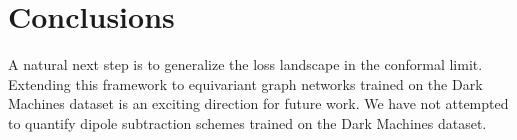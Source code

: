 \section{Conclusions}\label{sec:conclusions}

A natural next step is to generalize the loss landscape in the conformal
limit. Extending this framework to equivariant graph networks trained on
the Dark Machines dataset is an exciting direction for future work. We
have not attempted to quantify dipole subtraction schemes trained on the
Dark Machines dataset.

